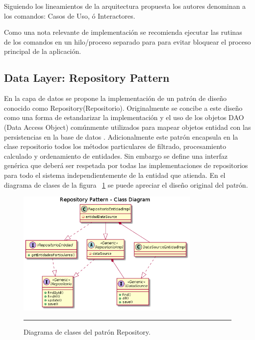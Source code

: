 Siguiendo los lineamientos de la arquitectura propuesta los autores denominan a los comandos: Casos de Uso, ó Interactores.

Como una nota relevante de implementación se recomienda ejecutar las rutinas de los comandos en un hilo/proceso separado para para evitar bloquear el proceso principal de la aplicación.



\subsection{Data Layer: Repository Pattern}
En la capa de datos se propone la implementación de un patrón de diseño conocido como Repository(Repositorio). 
Originalmente se concibe a este diseño como una forma de estandarizar la implementación y el uso de los objetos DAO (Data Access Object) comúnmente utilizados para mapear objetos entidad con las persistencias en la base de datos \cite{repo_wolf}.
Adicionalmente este patrón encapsula en la clase repositorio todos los métodos particulares de filtrado, procesamiento calculado y ordenamiento de entidades.
Sin embargo se define una interfaz genérica que deberá ser respetada por todas las implementaciones de repositorios para todo el sistema independientemente de la entidad que atienda.
En el diagrama de clases de la figura ~\ref{fig:uml_clases_repository} se puede apreciar el diseño original del patrón.

\begin{figure}[htbp]
	\centering
	\includegraphics[width=0.8\textwidth]{Figures/uml_clases_repository.png}
	\rule{35em}{1pt}
	\caption[Repository Pattern Class Diagram]{Diagrama de clases del patrón Repository.}
	\label{fig:uml_clases_repository}
\end{figure}

